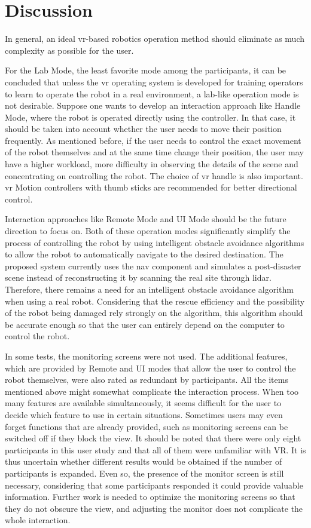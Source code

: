 \chapter{Discussion}
\label{discuss}
In general, an ideal \gls{vr}-based robotics operation method should eliminate as much complexity as possible for the user.

For the Lab Mode, the least favorite mode among the participants, it can be concluded that unless the \gls{vr} operating system is developed for training operators to learn to operate the robot in a real environment, a lab-like operation mode is not desirable. Suppose one wants to develop an interaction approach like Handle Mode, where the robot is operated directly using the controller. In that case, it should be taken into account whether the user needs to move their position frequently. As mentioned before, if the user needs to control the exact movement of the robot themselves and at the same time change their position, the user may have a higher workload, more difficulty in observing the details of the scene and concentrating on controlling the robot. The choice of \gls{vr} handle is also important. \gls{vr} Motion controllers with thumb sticks are recommended for better directional control.


Interaction approaches like Remote Mode and UI Mode should be the future direction to focus on. Both of these operation modes significantly simplify the process of controlling the robot by using intelligent obstacle avoidance algorithms to allow the robot to automatically navigate to the desired destination. The proposed system currently uses the \gls{nav} component and simulates a post-disaster scene instead of reconstructing it by scanning the real site through \gls{lidar}. Therefore, there remains a need for an intelligent obstacle avoidance algorithm when using a real robot. Considering that the rescue efficiency and the possibility of the robot being damaged rely strongly on the algorithm, this algorithm should be accurate enough so that the user can entirely depend on the computer to control the robot.


In some tests, the monitoring screens were not used. The additional features, which are provided by Remote and UI modes that allow the user to control the robot themselves, were also rated as redundant by participants. All the items mentioned above might somewhat complicate the interaction process. When too many features are available simultaneously, it seems difficult for the user to decide which feature to use in certain situations. Sometimes users may even forget functions that are already provided, such as monitoring screens can be switched off if they block the view.
It should be noted that there were only eight participants in this user study and that all of them were unfamiliar with VR. It is thus uncertain whether different results would be obtained if the number of participants is expanded. Even so, the presence of the monitor screen is still necessary, considering that some participants responded it could provide valuable information. Further work is needed to optimize the monitoring screens so that they do not obscure the view, and adjusting the monitor does not complicate the whole interaction.

